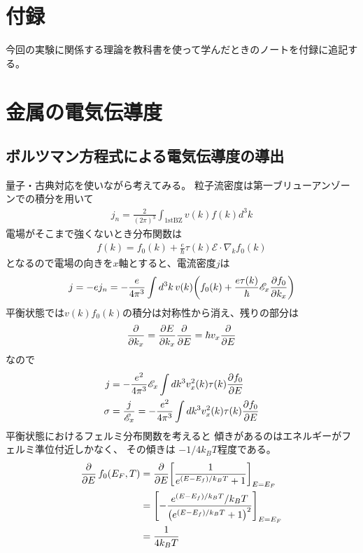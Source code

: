 \documentclass[11pt,dvipdfmx,a4paper]{jsarticle}
\begin{document}



\section*{付録}
今回の実験に関係する理論を教科書\cite{ibach-luth}を使って学んだときのノートを付録に追記する。
\section{金属の電気伝導度}



\subsection{ボルツマン方程式による電気伝導度の導出}
量子・古典対応を使いながら考えてみる。
粒子流密度は第一ブリューアンゾーンでの積分を用いて
\begin{align}
    j_n = \frac{2}{(2\pi)^3}\int_{\text{1stBZ}} v(k)f(k) d^3k %
\end{align}
電場がそこまで強くないとき分布関数は
\begin{align}
    f(k) = f_0(k) + \frac{e}{\hbar}\tau(k)\mathscr{E}\cdot\nabla_kf_0(k)
\end{align}
となるので電場の向きを\(x\)軸とすると、電流密度\(j\)は
\begin{align}
    j = -ej_n = -\frac{e}{4\pi^3} \int d^3k\,v(k) \qty(f_0(k)
    +\frac{e\tau(k)}{\hbar}\mathscr{E}_x\pdv{f_0}{k_x}) %
\end{align}
平衡状態では\(v(k)f_0(k)\)の積分は対称性から消え、残りの部分は
\begin{align}
    \pdv{k_x} = \pdv{E}{k_x}\pdv{E} = \hbar v_x \pdv{E} %
\end{align}
なので
\begin{align}
    j &= -\frac{e^2}{4\pi^3}\mathscr{E}_x\int dk^3 v_x^2(k)\tau(k)\pdv{f_0}{E} \\%
    \sigma &= \frac{j}{\mathscr{E}_x} = -\frac{e^2}{4\pi^3}\int dk^3 v_x^2(k)\tau(k)\pdv{f_0}{E} %
\end{align}
平衡状態におけるフェルミ分布関数を考えると
傾きがあるのはエネルギーがフェルミ準位付近しかなく、
その傾きは \(-1/4k_BT\)程度である。
\begin{align}
    \pdv{E}\,f_0(E_F,T) &= \pdv{E}\qty[\frac{1}{e^{(E-E_f)/k_BT}+1}]_{E=E_F}\\
    &=\qty[-\frac{e^{(E-E_f)/k_BT}/k_BT}{\qty(e^{(E-E_f)/k_BT}+1)^2}]_{E=E_F}\\
    &=\frac{1}{4k_BT}
\end{align}
\end{document}
